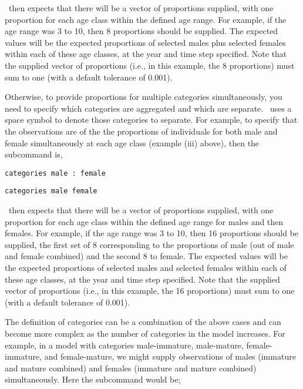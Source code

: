 \TODOend

\SPM\ then expects that there will be a vector of proportions supplied, with one proportion for each age class within the defined age range. For example, if the age range was 3 to 10, then 8 proportions should be supplied. The expected values will be the expected proportions of selected males plus selected females within each of these age classes, at the year and time step specified. Note that the supplied vector of proportions (i.e., in this example, the 8 proportions) must sum to one (with a default tolerance of 0.001).

Otherwise, to provide proportions for multiple categories simultaneously, you need to specify which categories are aggregated and which are separate. \SPM\ uses a space symbol to denote those categories to separate. For example, to specify that the observations are of the the proportions of individuals for both male and female simultaneously at each age class (example (iii) above), then the subcommand  is,

\TOUNDO

\begin{verbatim}
categories male : female
\end{verbatim}

\TOUNDOend

\TODO

\begin{verbatim}
categories male female
\end{verbatim}

\TODOend

\SPM\ then expects that there will be a vector of proportions supplied, with one proportion for each age class within the defined age range for males and then females. For example, if the age range was 3 to 10, then 16 proportions should be supplied, the first set of 8 corresponding to the proportions of male (out of male and female combined) and the second 8 to female. The expected values will be the expected proportions of selected males and selected females within each of these age classes, at the year and time step specified. Note that the supplied vector of proportions (i.e., in this example, the 16 proportions) must sum to one (with a default tolerance of 0.001).

The definition of categories can be a combination of the above cases and can become more complex as the number of categories in the model increases. For example, in a model with categories male-immature, male-mature, female-immature, and female-mature, we might supply observations of males (immature and mature combined) and females (immature and mature combined) simultaneously. Here the  subcommand would be;

